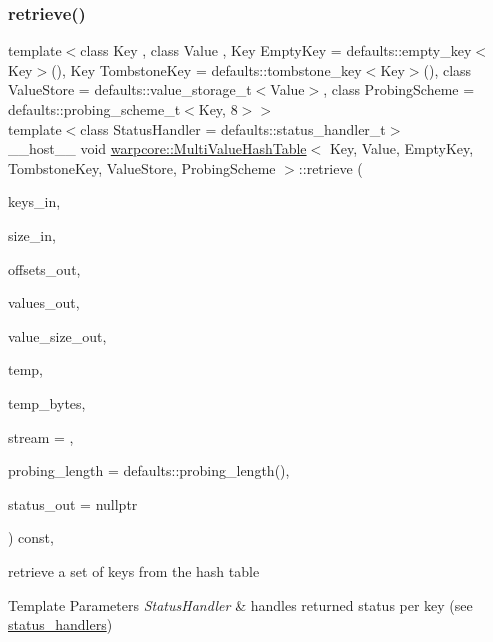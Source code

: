 \subsubsection{\texorpdfstring{retrieve()}{retrieve()}\hspace{0.1cm}{\footnotesize\ttfamily [2/2]}}
{\footnotesize\ttfamily template$<$class Key , class Value , Key Empty\+Key = defaults\+::empty\+\_\+key$<$\+Key$>$(), Key Tombstone\+Key = defaults\+::tombstone\+\_\+key$<$\+Key$>$(), class Value\+Store  = defaults\+::value\+\_\+storage\+\_\+t$<$\+Value$>$, class Probing\+Scheme  = defaults\+::probing\+\_\+scheme\+\_\+t$<$\+Key, 8$>$$>$ \\
template$<$class Status\+Handler  = defaults\+::status\+\_\+handler\+\_\+t$>$ \\
\+\_\+\+\_\+host\+\_\+\+\_\+ void \hyperlink{classwarpcore_1_1MultiValueHashTable}{warpcore\+::\+Multi\+Value\+Hash\+Table}$<$ Key, Value, Empty\+Key, Tombstone\+Key, Value\+Store, Probing\+Scheme $>$\+::retrieve (\begin{DoxyParamCaption}\item[{key\+\_\+type $\ast$}]{keys\+\_\+in,  }\item[{index\+\_\+type}]{size\+\_\+in,  }\item[{index\+\_\+type $\ast$}]{offsets\+\_\+out,  }\item[{value\+\_\+type $\ast$}]{values\+\_\+out,  }\item[{index\+\_\+type \&}]{value\+\_\+size\+\_\+out,  }\item[{void $\ast$}]{temp,  }\item[{index\+\_\+t \&}]{temp\+\_\+bytes,  }\item[{cuda\+Stream\+\_\+t}]{stream = {},  }\item[{index\+\_\+type}]{probing\+\_\+length = {\ttfamily defaults\+:\+:probing\+\_\+length()},  }\item[{typename Status\+Handler\+::base\+\_\+type $\ast$}]{status\+\_\+out = {\ttfamily nullptr} }\end{DoxyParamCaption}) const\hspace{0.3cm}{\ttfamily [inline]}, {\ttfamily [noexcept]}}



retrieve a set of keys from the hash table 


\begin{DoxyTemplParams}{Template Parameters}
{\em Status\+Handler} & handles returned status per key (see {\ttfamily \hyperlink{namespacewarpcore_1_1status__handlers}{status\+\_\+handlers}}) \\
\hline
\end{DoxyTemplParams}

